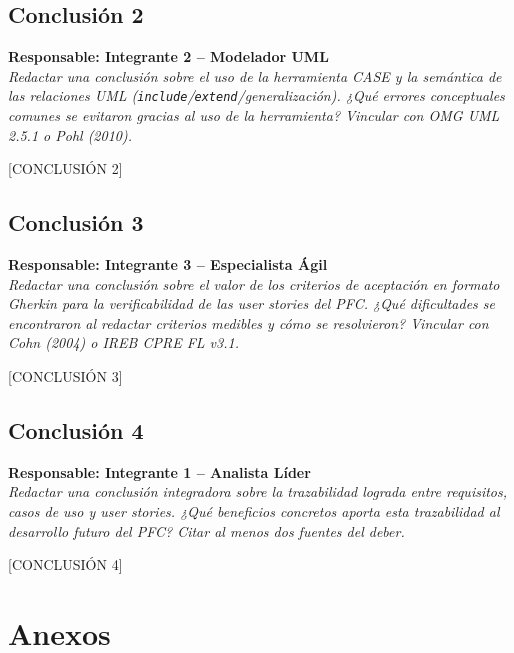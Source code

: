 \documentclass[journal,onecolumn]{IEEEtran}
\newcommand{\guia}[2]{%
  \begin{mdframed}[style=guia]
    \noindent\textbf{Responsable: #1}\\[2pt]
    \textit{#2}
  \end{mdframed}
}
\begin{document}
\subsection*{Conclusión 2}

\guia{Integrante 2 -- Modelador UML}{%
Redactar una conclusión sobre el uso de la herramienta CASE y la semántica
de las relaciones UML (\texttt{include}/\texttt{extend}/generalización).
¿Qué errores conceptuales comunes se evitaron gracias al uso de la herramienta?
Vincular con OMG UML 2.5.1 o Pohl (2010).}

[CONCLUSIÓN 2]

\subsection*{Conclusión 3}

\guia{Integrante 3 -- Especialista Ágil}{%
Redactar una conclusión sobre el valor de los criterios de aceptación en
formato Gherkin para la verificabilidad de las user stories del PFC.
¿Qué dificultades se encontraron al redactar criterios medibles y cómo se resolvieron?
Vincular con Cohn (2004) o IREB CPRE FL v3.1.}

[CONCLUSIÓN 3]

\subsection*{Conclusión 4}

\guia{Integrante 1 -- Analista Líder}{%
Redactar una conclusión integradora sobre la trazabilidad lograda entre
requisitos, casos de uso y user stories. ¿Qué beneficios concretos aporta
esta trazabilidad al desarrollo futuro del PFC?
Citar al menos dos fuentes del deber.}

[CONCLUSIÓN 4]

\newpage



\newpage

\section{Anexos}
\end{document}
